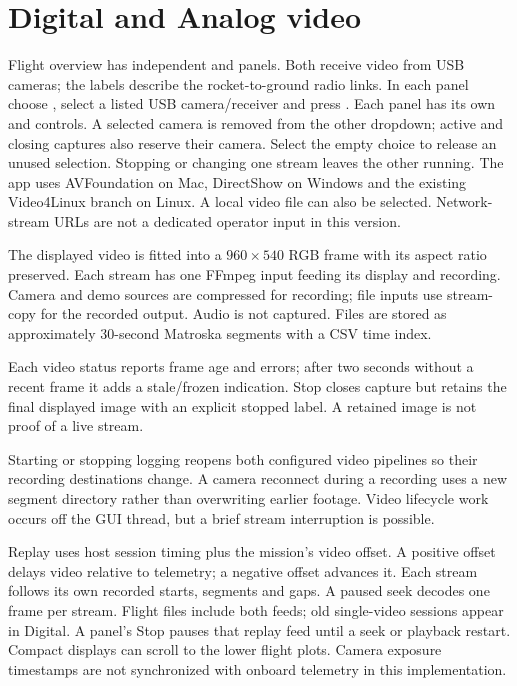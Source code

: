 \section{Digital and Analog video}
Flight overview has independent  and  panels. Both receive
video from USB cameras; the labels describe the rocket-to-ground radio links.
In each panel choose , select a listed USB camera/receiver and press
. Each panel has its own  and  controls.
A selected camera is removed from the other dropdown; active and closing
captures also reserve their camera. Select the empty choice to release an
unused selection. Stopping or changing one stream leaves the other running. The app uses AVFoundation on Mac, DirectShow on Windows and
the existing Video4Linux branch on Linux. A local video file can also be selected.
Network-stream URLs are not a dedicated operator input in this version.

The displayed video is fitted into a \(960\times540\) RGB frame with its aspect
ratio preserved. Each stream has one FFmpeg input feeding its display and recording. Camera and
demo sources are compressed for recording; file inputs use stream-copy for the
recorded output. Audio is not captured. Files are stored as approximately
30-second Matroska segments with a CSV time index.

Each video status reports frame age and errors; after two seconds without a
recent frame it adds a stale/frozen indication. Stop closes capture but retains
the final displayed image with an explicit stopped label. A retained image is
not proof of a live stream.

Starting or stopping logging reopens both configured video pipelines so their
recording destinations change. A camera reconnect during a recording uses a
new segment directory rather than overwriting earlier footage. Video lifecycle
work occurs off the GUI thread, but a brief stream interruption is possible.

Replay uses host session timing plus the mission's video offset. A positive
offset delays video relative to telemetry; a negative offset advances it.
Each stream follows its own recorded starts, segments and gaps. A paused seek
decodes one frame per stream. Flight files include both feeds; old single-video
sessions appear in Digital. A panel's Stop pauses that replay feed until a seek
or playback restart. Compact displays can scroll to the lower flight plots.
Camera exposure timestamps are not
synchronized with onboard telemetry in this implementation.

